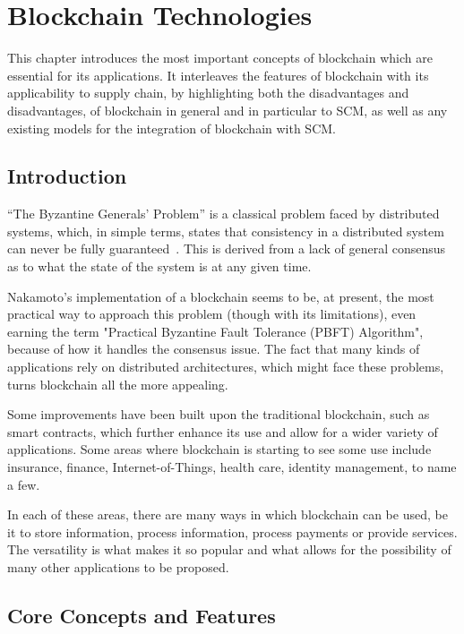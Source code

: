 \chapter{Blockchain Technologies}
\label{chap:blockchain}

\minitoc \mtcskip \noindent

This chapter introduces the most important concepts of blockchain which are essential for its applications. It interleaves the features of blockchain with its applicability to supply chain, by highlighting both the disadvantages and disadvantages, of blockchain in general and in particular to SCM, as well as any existing models for the integration of blockchain with SCM.

\section{Introduction}
“The Byzantine Generals' Problem” is a classical problem faced by distributed systems, which, in simple terms, states that consistency in a distributed system can never be fully guaranteed~\cite{byzantine-generals-problem}. This is derived from a lack of general consensus as to what the state of the system is at any given time.

Nakamoto's implementation of a blockchain seems to be, at present, the most practical way to approach this problem (though with its limitations), even earning the term "Practical Byzantine Fault Tolerance (PBFT) Algorithm", because of how it handles the consensus issue. The fact that many kinds of applications rely on distributed architectures, which might face these problems, turns blockchain all the more appealing. 
   
Some improvements have been built upon the traditional blockchain, such as smart contracts, which further enhance its use and allow for a wider variety of applications. Some areas where blockchain is starting to see some use include insurance, finance, Internet-of-Things, health care, identity management, to name a few.

In each of these areas, there are many ways in which blockchain can be used, be it to store information, process information, process payments or provide services. The versatility is what makes it so popular and what allows for the possibility of many other applications to be proposed.

\section{Core Concepts and Features}

